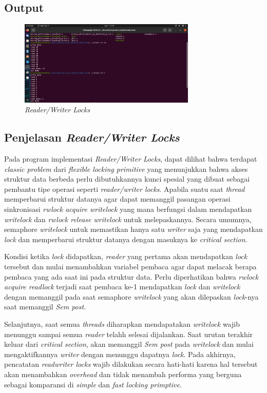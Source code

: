 \documentclass[11pt,a4paper]{article}
\begin{document}
\subsection{Output}
\begin{figure}[h]
	\centering
	\includegraphics[width=0.75\textwidth]{Figure1/rwlock.png}
	\caption{\textit{Reader/Writer Locks}}
\end{figure}

\newpage
\subsection{Penjelasan \textit{Reader/Writer Locks}}
Pada program implementasi \textit{Reader/Writer Locks}, dapat dilihat bahwa terdapat \textit{classic problem} dari \textit{flexible locking primitive} yang menunjukkan bahwa 
akses struktur data berbeda perlu dibutuhkannya kunci spesial yang dibuat sebagai pembantu tipe operasi seperti \textit{reader/writer locks}. Apabila suatu saat \textit{thread} 
memperbarui struktur datanya agar dapat memanggil pasangan operasi sinkronisasi \textit{rwlock acquire writelock} yang mana berfungsi dalam mendapatkan \textit{writelock} dan 
\textit{rwlock release writelock} untuk melepaskannya. Secara umumnya, semaphore \textit{writelock} untuk memastikan hanya satu \textit{writer} saja yang mendapatkan \textit{lock} dan 
memperbarui struktur datanya dengan masuknya ke \textit{critical section}. \par
Kondisi ketika \textit{lock} didapatkan, \textit{reader} yang pertama akan mendapatkan \textit{lock} tersebut dan mulai menambahkan variabel pembaca agar dapat melacak berapa pembaca yang 
ada saat ini pada struktur data. Perlu diperhatikan bahwa \textit{rwlock acquire readlock} terjadi saat pembaca ke-1 mendapatkan \textit{lock} dan \textit{writelock} dengan memanggil  
pada saat semaphore \textit{writelock} yang akan dilepaskan \textit{lock}-nya saat memanggil \textit{Sem post}. \par
Selanjutnya, saat semua \textit{threads} diharapkan mendapatakan \textit{writelock} wajib menunggu sampai semua \textit{reader} telahh selesai dijalankan. Saat urutan terakhir keluar dari \textit{critical section}, akan 
memanggil \textit{Sem post} pada \textit{writelock} dan mulai mengaktifkannya \textit{writer} dengan menunggu dapatnya \textit{lock}. Pada akhirnya, pencatatan \textit{readwriter locks} wajib dilakukan secara hati-hati karena 
hal tersebut akan menambahkan \textit{overhead} dan tidak menambah performa yang berguna sebagai komparansi di \textit{simple} dan \textit{fast locking primptive}.
\end{document}
